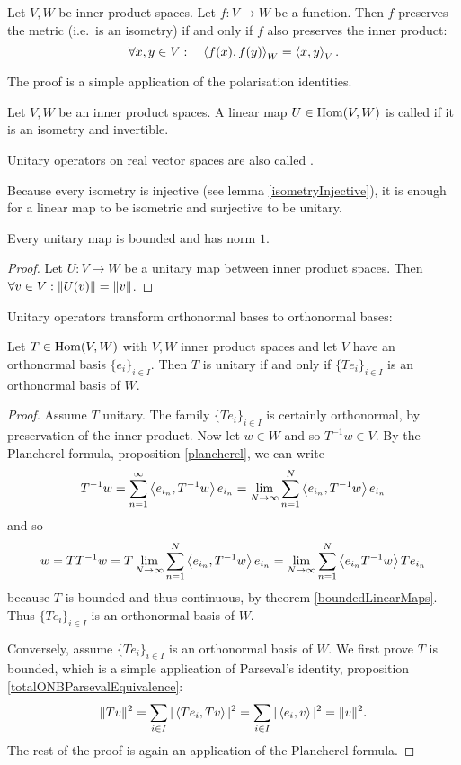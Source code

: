 \begin{lemma}
Let $V,W$ be inner product spaces. Let $f:V\to W$ be a function. Then $f$ preserves the metric (i.e.\ is an isometry) \textup{if and only if} $f$ also preserves the inner product:
\[ \forall x,y \in V: \quad \left\langle f(x),f(y) \right\rangle_W = \left\langle x,y \right\rangle_V. \]
\end{lemma}
The proof is a simple application of the polarisation identities.

\begin{definition}
Let $V,W$ be an inner product spaces. A linear map $U\in\operatorname{Hom}(V,W)$ is called  if it is an isometry and invertible.

Unitary operators on real vector spaces are also called .
\end{definition}
Because every isometry is injective (see lemma \ref{isometryInjective}), it is enough for a linear map to be isometric and surjective to be unitary.

\begin{lemma}
Every unitary map is bounded and has norm $1$.
\end{lemma}
\begin{proof}
Let $U: V\to W$ be a unitary map between inner product spaces. Then $\forall v\in V: \lVert U(v)\rVert = \lVert v\rVert$.
\end{proof}

Unitary operators transform orthonormal bases to orthonormal bases:
\begin{proposition}
Let $T\in \operatorname{Hom}(V,W)$ with $V,W$ inner product spaces and let $V$ have an orthonormal basis $\{e_i\}_{i\in I}$. Then $T$ is unitary \textup{if and only if} $\{Te_i\}_{i\in I}$ is an orthonormal basis of $W$.
\end{proposition}
\begin{proof}
Assume $T$ unitary. The family $\{Te_i\}_{i\in I}$ is certainly orthonormal, by preservation of the inner product. Now let $w\in W$ and so $T^{-1}w\in V$. By the Plancherel formula, proposition \ref{plancherel}, we can write
\[ T^{-1}w = \sum_{n=1}^\infty \left\langle e_{i_n},T^{-1}w \right\rangle e_{i_n} = \lim_{N\to\infty}\sum_{n=1}^N \left\langle e_{i_n},T^{-1}w \right\rangle e_{i_n} \]
and so
\[ w = TT^{-1}w = T\lim_{N\to\infty}\sum_{n=1}^N \left\langle e_{i_n},T^{-1}w \right\rangle e_{i_n} = \lim_{N\to\infty}\sum_{n=1}^N \left\langle e_{i_n}T^{-1}w \right\rangle Te_{i_n} \]
because $T$ is bounded and thus continuous, by theorem \ref{boundedLinearMaps}.
Thus $\{Te_i\}_{i\in I}$ is an orthonormal basis of $W$.

Conversely, assume $\{Te_i\}_{i\in I}$ is an orthonormal basis of $W$. We first prove $T$ is bounded, which is a simple application of Parseval's identity, proposition \ref{totalONBParsevalEquivalence}:
\[ \lVert Tv\rVert^2 = \sum_{i\in I}|\left\langle Te_i,Tv \right\rangle|^2 = \sum_{i\in I}|\left\langle e_i,v \right\rangle|^2 = \lVert v\rVert^2. \]
The rest of the proof is again an application of the Plancherel formula.
\end{proof}

